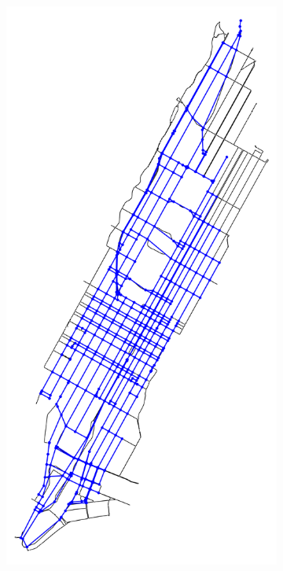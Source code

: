\begin{figure}[tbh]
\begin{subfigure}[b]{0.32\textwidth}
		\caption{}
		\label{fig:nyc_simplified_info}
	\end{subfigure}
	\begin{subfigure}[b]{0.32\textwidth}
		\centering
		\includegraphics[width=\textwidth]{assets/img/07_graph_based/new_york_simplified_roads.png}
		\caption{}
		\label{fig:nyc_simplified_roads}
	\end{subfigure}
	

\end{figure}
